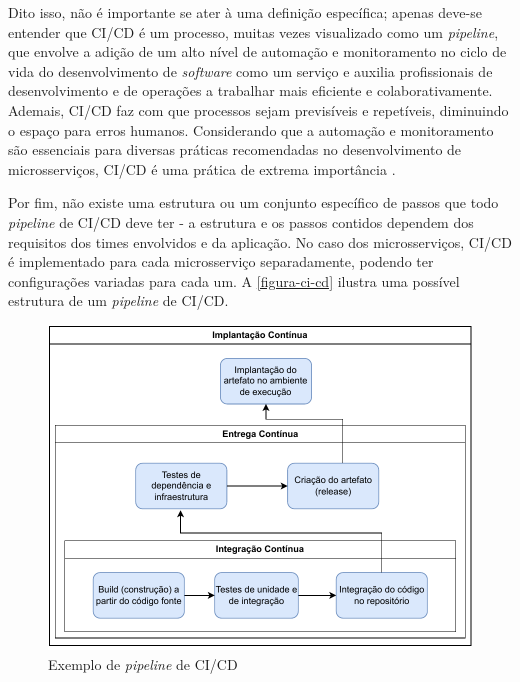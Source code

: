 Dito isso, não é importante se ater à uma definição específica; apenas deve-se entender que CI/CD é um processo, muitas vezes visualizado como um \emph{pipeline}, que envolve a adição de um alto nível de automação e monitoramento no ciclo de vida do desenvolvimento de \emph{software} como um serviço e auxilia profissionais de desenvolvimento e de operações a trabalhar mais eficiente e colaborativamente. Ademais, CI/CD faz com que processos sejam previsíveis e repetíveis, diminuindo o espaço para erros humanos. Considerando que a automação e monitoramento são essenciais para diversas práticas recomendadas no desenvolvimento de microsserviços, CI/CD é uma prática de extrema importância \cite{redhat-ci-cd, gitlab-ci-cd}.

Por fim, não existe uma estrutura ou um conjunto específico de passos que todo \emph{pipeline} de CI/CD deve ter - a estrutura e os passos contidos dependem dos requisitos dos times envolvidos e da aplicação. No caso dos microsserviços, CI/CD é implementado para cada microsserviço separadamente, podendo ter configurações variadas para cada um. A \autoref{figura-ci-cd} ilustra uma possível estrutura de um \emph{pipeline} de CI/CD. 


\begin{figure}[htb]
	\caption{\label{figura-ci-cd}Exemplo de \emph{pipeline} de CI/CD}
	\begin{center}
	    \includegraphics[scale=1]{Imagens/CICD.drawio.pdf}
	\end{center}
\end{figure}

